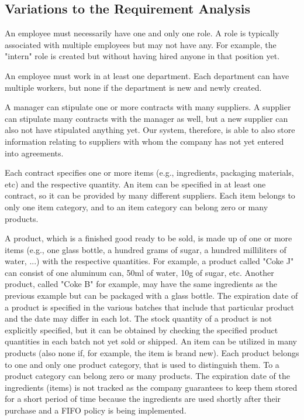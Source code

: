 \subsection{Variations to the Requirement Analysis}


An employee must necessarily have one and only one role. A role is typically associated with multiple employees but may not have any. For example, the "intern" role is created but without having hired anyone in that position yet.

An employee must work in at least one department. Each department can have multiple workers, but none if the department is new and newly created.

A manager can stipulate one or more contracts with many suppliers. A supplier can stipulate many contracts with the manager as well, but a new supplier can also not have stipulated anything yet. Our system, therefore, is able to also store information relating to suppliers with whom the company has not yet entered into agreements.

Each contract specifies one or more items (e.g., ingredients, packaging materials, etc) and the respective quantity. An item can be specified in at least one contract, so it can be provided by many different suppliers. Each item belongs to only one item category, and to an item category can belong zero or many products.

A product, which is a finished good ready to be sold, is made up of one or more items (e.g., one glass bottle, a hundred grams of sugar, a hundred milliliters of water, ...) with the respective quantities. For example, a product called "Coke J" can consist of one aluminum can, 50ml of water, 10g of sugar, etc. Another product, called "Coke B" for example, may have the same ingredients as the previous example but can be packaged with a glass bottle. The expiration date of a product is specified in the various batches that include that particular product and the date may differ in each lot. The stock quantity of a product is not explicitly specified, but it can be obtained by checking the specified product quantities in each batch not yet sold or shipped. An item can be utilized in many products (also none if, for example, the item is brand new). Each product belongs to one and only one product category, that is used to distinguish them. To a product category can belong zero or many products. The expiration date of the ingredients (items) is not tracked as the company guarantees to keep them stored for a short period of time because the ingredients are used shortly after their purchase and a FIFO policy is being implemented.

